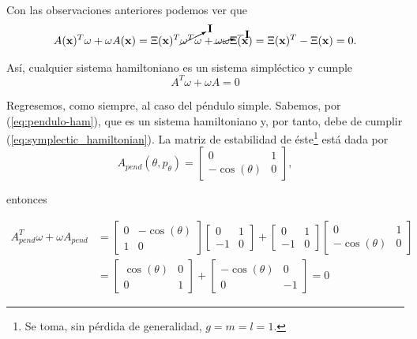 Con las observaciones anteriores podemos ver que
\begin{align*}
 A(\mathbf{x})^T \omega + \omega A(\mathbf{x}) = \Xi(\mathbf{x})^T \cancelto{\mathbf{I}}{\omega^T \omega} + \cancelto{-\mathbf{I}}{\omega \omega}\Xi(\mathbf{x}) = \Xi(\mathbf{x})^T - \Xi(\mathbf{x}) = 0.
\end{align*}

Así, cualquier sistema hamiltoniano es un sistema simpléctico y cumple
\begin{equation}
 A^T\omega + \omega A = 0
 \label{eq:symplectic_hamiltonian}
\end{equation}


Regresemos, como siempre, al caso del péndulo simple. Sabemos, por (\ref{eq:pendulo-ham}), que es un sistema hamiltoniano y, por tanto, debe de cumplir (\ref{eq:symplectic_hamiltonian}). La matriz de estabilidad de éste\footnote{Se toma, sin pérdida de generalidad, $g = m = l = 1$.} está dada por
\begin{equation*}
  A_{pend}(\theta,p_\theta) =
  \begin{bmatrix}
    0             & 1 \\
    -\cos(\theta) & 0
  \end{bmatrix},
\end{equation*}

entonces

\begin{align*}
  A_{pend}^T \omega + \omega A_{pend} &=
  \begin{bmatrix}
    0 & -\cos(\theta) \\
    1 & 0
  \end{bmatrix}   
  \begin{bmatrix}
    0  & 1 \\
    -1 & 0
  \end{bmatrix} 
  +
  \begin{bmatrix}
    0  & 1 \\
    -1 & 0
  \end{bmatrix} 
  \begin{bmatrix}
    0             & 1 \\
    -\cos(\theta) & 0
  \end{bmatrix} \\
  &=
  \begin{bmatrix}
    \cos(\theta)  & 0 \\
    0             & 1
  \end{bmatrix}
  +
  \begin{bmatrix}
    -\cos(\theta)  & 0 \\
    0              & -1
  \end{bmatrix}
  = 0 
\end{align*}

